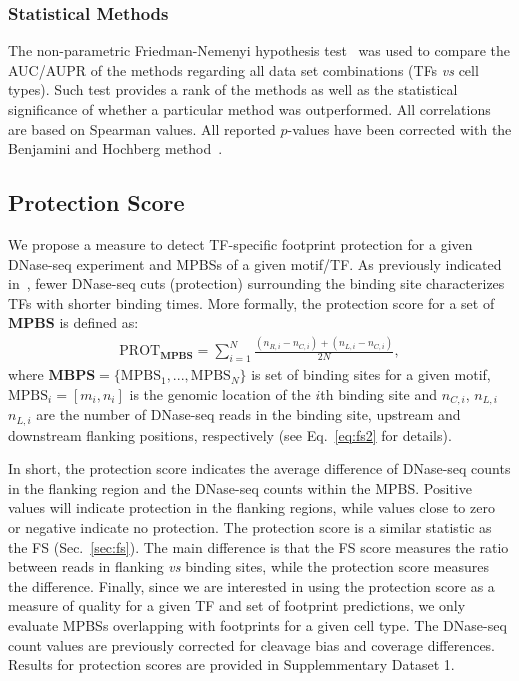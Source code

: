 \documentclass[11pt]{article}
\begin{document}
\subsubsection{Statistical Methods}
\label{sec:stat-methods}

The non-parametric Friedman-Nemenyi hypothesis test~\citep{demsar2006} was used to compare the AUC/AUPR of the methods regarding all data set combinations (TFs \textit{vs} cell types). Such test provides a rank of the methods as well as the statistical significance of whether a particular method was outperformed. All correlations are based on Spearman values. All reported $p$-values have been corrected with the Benjamini and Hochberg method~\citep{benjamini1995}.

\subsection{Protection Score}
\label{sec:protection}

We propose a measure to detect TF-specific footprint protection for a given DNase-seq experiment and MPBSs of a given motif/TF. As previously indicated in~\cite{sung2014}, fewer DNase-seq cuts (protection) surrounding the binding site characterizes TFs with shorter binding times. More formally, the protection score for a set of $\mathbf{MPBS}$ is defined as:
\begin{align}
\text{PROT}_{\mathbf{MPBS}} = \sum_{i=1}^N \frac{({n}_{R,i} - {n}_{C,i}) + ({n}_{L,i} - {n}_{C,i})}{2N},
\label{eq:prot}
\end{align}
where $\mathbf{MBPS}=\{\text{MPBS}_{1},...,\text{MPBS}_{N}\}$ is set of binding sites for a given motif, $\text{MPBS}_{i} = [{m}_{i},{n}_{i}]$  is the genomic location of the $i$th binding site and ${n}_{C,i}$, ${n}_{L,i}$  ${n}_{L,i}$ are the number of DNase-seq reads in the binding site, upstream and downstream flanking positions, respectively (see Eq.~\ref{eq:fs2} for details).

In short, the protection score indicates the average difference of DNase-seq counts in the flanking region and the DNase-seq counts within the MPBS. Positive values will indicate protection in the flanking regions, while values close to zero or negative indicate no protection. The protection score is a similar statistic as the FS (Sec.~\ref{sec:fs}). The main difference is that the FS score measures the ratio between reads in flanking \textit{vs} binding sites, while the protection score measures the difference. Finally, since we are interested in using the protection score as a measure of quality for a given TF and set of footprint predictions, we only evaluate MPBSs overlapping with footprints for a given cell type. The DNase-seq count values are previously corrected for cleavage bias and coverage differences. Results for protection scores are provided in Supplemmentary Dataset 1.
\end{document}
